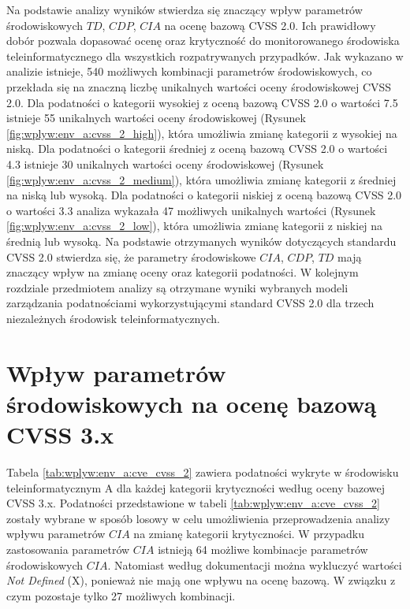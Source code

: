 \bigbreak
Na podstawie analizy wyników stwierdza się znaczący wpływ parametrów środowiskowych $TD$, $CDP$, $CIA$ na ocenę bazową CVSS 2.0. Ich prawidłowy dobór pozwala dopasować ocenę oraz krytyczność do monitorowanego środowiska teleinformatycznego dla wszystkich rozpatrywanych przypadków. Jak wykazano w analizie istnieje, 540 możliwych kombinacji parametrów środowiskowych, co przekłada się na znaczną liczbę unikalnych wartości oceny środowiskowej CVSS 2.0. Dla podatności o kategorii wysokiej z oceną bazową CVSS 2.0 o wartości 7.5 istnieje 55 unikalnych wartości oceny środowiskowej (Rysunek \ref{fig:wplyw:env_a:cvss_2_high}), która umożliwia zmianę kategorii z wysokiej na niską. Dla podatności o kategorii średniej z oceną bazową CVSS 2.0 o wartości 4.3 istnieje 30 unikalnych wartości oceny środowiskowej (Rysunek \ref{fig:wplyw:env_a:cvss_2_medium}), która umożliwia zmianę kategorii z średniej na niską lub wysoką. Dla podatności o kategorii niskiej z oceną bazową CVSS 2.0 o wartości 3.3 analiza wykazała 47 możliwych unikalnych wartości (Rysunek \ref{fig:wplyw:env_a:cvss_2_low}), która umożliwia zmianę kategorii z niskiej na średnią lub wysoką. Na podstawie otrzymanych wyników dotyczących standardu CVSS 2.0 stwierdza się, że parametry środowiskowe $CIA$, $CDP$, $TD$ mają znaczący wpływ na zmianę oceny oraz kategorii podatności. W kolejnym rozdziale przedmiotem analizy są otrzymane wyniki wybranych modeli zarządzania podatnościami wykorzystującymi standard CVSS 2.0 dla trzech niezależnych środowisk teleinformatycznych.


\section{Wpływ parametrów środowiskowych na ocenę bazową CVSS 3.x}
\label{sec:wplyw_cvss3}
Tabela \ref{tab:wplyw:env_a:cve_cvss_2} zawiera podatności wykryte w środowisku teleinformatycznym A dla każdej kategorii krytyczności według oceny bazowej CVSS 3.x. Podatności przedstawione w tabeli \ref{tab:wplyw:env_a:cve_cvss_2} zostały wybrane w sposób losowy w celu umożliwienia przeprowadzenia analizy wpływu parametrów $CIA$ na zmianę kategorii krytyczności. W przypadku zastosowania parametrów $CIA$ istnieją 64 możliwe kombinacje parametrów środowiskowych $CIA$. Natomiast według dokumentacji \cite{cvs2019specification} można wykluczyć wartości \emph{Not Defined} (X), ponieważ nie mają one wpływu na ocenę bazową. W związku z czym pozostaje tylko 27 możliwych kombinacji.

